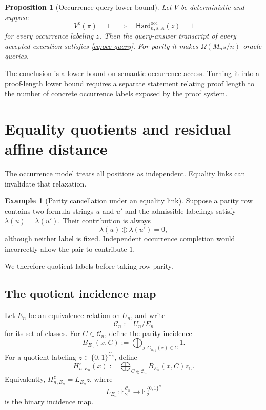\documentclass[11pt]{article}
\newtheorem{proposition}[theorem]{Proposition}
\theoremstyle{definition}
\newtheorem{example}[theorem]{Example}
\newcommand{\bits}{\{0,1\}}
\newcommand{\F}{\mathbb{F}_2}
\newcommand{\HardO}{\mathsf{Hard}^{\mathrm{occ}}}
\begin{document}
\begin{proposition}[Occurrence-query lower bound]\label{prop:adaptive-occ}
Let $V$ be deterministic and suppose
\[
  V^z(\pi)=1
  \quad\Longrightarrow\quad
  \HardO_{n,s,A}(z)=1
\]
for every occurrence labeling $z$.  Then the query-answer transcript of every accepted execution satisfies \eqref{eq:occ-query}.  For parity it makes $\Omega(M_ns/n)$ oracle queries.
\end{proposition}

The conclusion is a lower bound on semantic occurrence access.  Turning it into a proof-length lower bound requires a separate statement relating proof length to the number of concrete occurrence labels exposed by the proof system.

\section{Equality quotients and residual affine distance}\label{sec:quotient}

The occurrence model treats all positions as independent.  Equality links can invalidate that relaxation.

\begin{example}[Parity cancellation under an equality link]\label{ex:cancellation}
Suppose a parity row contains two formula strings $u$ and $u'$ and the admissible labelings satisfy $\lambda(u)=\lambda(u')$.  Their contribution is always
\[
  \lambda(u)\oplus\lambda(u')=0,
\]
although neither label is fixed.  Independent occurrence completion would incorrectly allow the pair to contribute $1$.
\end{example}

We therefore quotient labels before taking row parity.

\subsection{The quotient incidence map}

Let $E_n$ be an equivalence relation on $U_n$, and write
\[
  \mathcal C_n:=U_n/E_n
\]
for its set of classes.  For $C\in\mathcal C_n$, define the parity incidence
\[
  B_{E_n}(x,C)
  :=\bigoplus_{j:G_{n,j}(x)\in C}1.
\]
For a quotient labeling $z\in\bits^{\mathcal C_n}$, define
\begin{equation}\label{eq:quotient-carrier}
  H_{n,E_n}^{z}(x)
  :=\bigoplus_{C\in\mathcal C_n}B_{E_n}(x,C)z_C.
\end{equation}
Equivalently, $H_{n,E_n}^{z}=L_{E_n}z$, where
\[
  L_{E_n}:\F^{\mathcal C_n}\longrightarrow\F^{\bits^n}
\]
is the binary incidence map.
\end{document}
